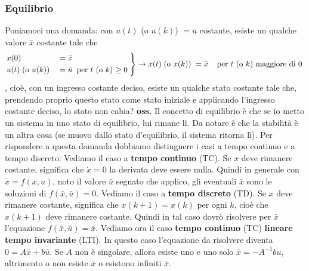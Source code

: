 \subsubsection{Equilibrio}
Poniamoci una domanda: con $u(t)$ (o $u(k)$) $=\bar{u}$ costante, esiste un qualche valore $\bar{x}$ costante tale che 
\[
    \begin{rcases}
        x(0) &= \bar{x}\\
        u(t) \;\text{(o $u(k)$)}\; &= \bar{u} \;\;\text{per $t$ (o $k$) $\geq 0$}\;
    \end{rcases} \rightarrow x(t) \;\text{(o $x(k)$)}\; = \bar{x} \;\;\;\;\text{per $t$ (o $k$) maggiore di 0}\;
\]
, cioè, con un ingresso costante deciso, esiste un qualche stato costante tale che, prendendo proprio questo stato come stato iniziale e applicando l'ingresso costante deciso, lo stato non cabia?\newline
\newline
\textbf{oss.} Il concetto di equilibrio è che se io metto un sistema in uno stato di equilibrio, lui rimane lì. Da notare è che la stabilità è un altra cosa (se muovo dallo stato d'equilibrio, il sistema ritorna lì).\newline
\newline
Per rispondere a questa domanda dobbiamo distinguere i casi a tempo continuo e a tempo discreto:\newline
\newline
Vediamo il caso a \textbf{tempo continuo} (TC). Se $x$ deve rimanere costante, significa che $\dot{x} = 0$ la derivata deve essere nulla. Quindi in generale con $\dot{x} = f(x,u)$, noto il valore $\bar{u}$ segnato che applico, gli eventuali $\bar{x}$ sono le soluzioni di $f(\bar{x}, \bar{u}) = 0$.\newline
\newline
Vediamo il caso a \textbf{tempo discreto} (TD). Se $x$ deve rimanere costante, significa che $x(k+1) = x(k)$ per ogni $k$, cioè che $x(k+1)$ deve rimanere costante. Quindi in tal caso dovrò risolvere per $\bar{x}$ l'equazione $f(\bar{x}, \bar{u}) = \bar{x}$.\newline
\newline
Vediamo ora il caso \textbf{tempo continuo} (TC) \textbf{lineare tempo invariante} (LTI). In questo caso l'equazione da risolvere diventa $0 = A \bar{x} + b \bar{u}$. Se $A$ non è singolare, allora esiste uno e uno solo $\bar{x} = -A^{-1} b u$, altrimento o non esiste $\bar{x}$ o esistono infiniti $\bar{x}$.\newline
\newline
